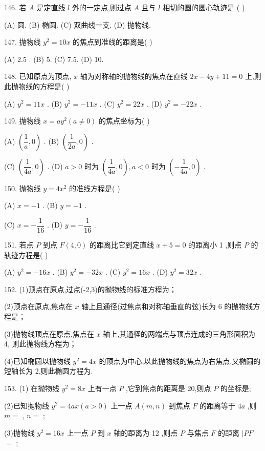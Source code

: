 146. 若 $A$ 是定直线 $l$ 外的一定点,则过点 $A$ 且与 $l$ 相切的圆的圆心轨迹是 (   )

(A) 圆. (B) 椭圆. (C) 双曲线一支. (D) 抛物线.

147. 抛物线 ${y}^{2} = {10x}$ 的焦点到准线的距离是(   )

(A) 2.5 . (B) 5. (C) 7.5. (D) 10.

148. 已知原点为顶点, $x$ 轴为对称轴的抛物线的焦点在直线 ${2x} - {4y} + {11} = 0$ 上,则此抛物线的方程是(   )

(A) ${y}^{2} = {11x}$ . (B) ${y}^{2} =  - {11x}$ . (C) ${y}^{2} = {22x}$ . (D) ${y}^{2} =  - {22x}$ .

149. 抛物线 $x = a{y}^{2}\left( {a \neq  0}\right)$ 的焦点坐标为(   )

(A) $\left( {\dfrac{1}{a},0}\right)$ . (B) $\left( {\dfrac{1}{2a},0}\right)$ .

(C) $\left( {\dfrac{1}{4a},0}\right)$ . (D) $a > 0$ 时为 $\left( {\dfrac{1}{4a},0}\right) ,a < 0$ 时为 $\left( {-\dfrac{1}{4a},0}\right)$ .

150. 抛物线 $y = 4{x}^{2}$ 的准线方程是(   )

(A) $x =  - 1$ . (B) $y =  - 1$ .

(C) $x =  - \dfrac{1}{16}$ . (D) $y =  - \dfrac{1}{16}$ .

151. 若点 $P$ 到点 $F\left( {4,0}\right)$ 的距离比它到定直线 $x + 5 = 0$ 的距离小 1 ,则点 $P$ 的轨迹方程是(   )

(A) ${y}^{2} =  - {16x}$ . (B) ${y}^{2} =  - {32x}$ . (C) ${y}^{2} = {16x}$ . (D) ${y}^{2} = {32x}$ .

152. (1)顶点在原点,过点(-2,3)的抛物线的标准方程为\blkda{}；

(2)顶点在原点,焦点在 $x$ 轴上且通径(过焦点和对称轴垂直的弦)长为 6 的抛物线方程是\blkda{}；

(3)抛物线顶点在原点,焦点在 $x$ 轴上,其通径的两端点与顶点连成的三角形面积为 4, 则此抛物线方程为\blkda{}；

(4)已知椭圆以抛物线 ${y}^{2} = {4x}$ 的顶点为中心,以此抛物线的焦点为右焦点,又椭圆的短轴长为 2,则此椭圆方程为\blkda{}.

153. (1) 在抛物线 ${y}^{2} = {8x}$ 上有一点 $P$ ,它到焦点的距离是 20,则点 $P$ 的坐标是\blkda{};

(2)已知抛物线 ${y}^{2} = {4ax}\left( {a > 0}\right)$ 上一点 $A\left( {m,n}\right)$ 到焦点 $F$ 的距离等于 ${4a}$ ,则 $m =$ \blkda{}, $n =$ \blkda{};

(3)抛物线 ${y}^{2} = {16x}$ 上一点 $P$ 到 $x$ 轴的距离为 12 ,则点 $P$ 与焦点 $F$ 的距离 $\left| {PF}\right|$  $=$ \blkda{};

